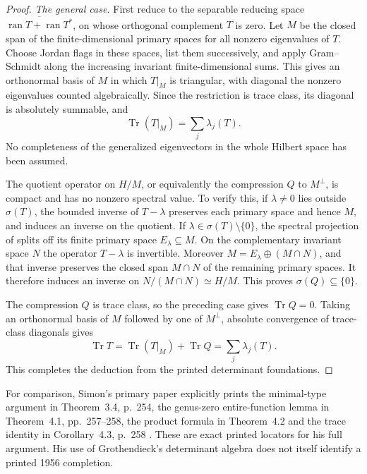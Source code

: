\begin{proof}
\emph{The general case.}
First reduce to the separable reducing space
$\overline{\operatorname{ran}T+\operatorname{ran}T^*}$, on whose
orthogonal complement $T$ is zero. Let $M$ be the closed span of the
finite-dimensional primary spaces for all nonzero eigenvalues of $T$.
Choose Jordan flags in these spaces, list them successively, and apply
Gram--Schmidt along the increasing invariant finite-dimensional sums.
This gives an orthonormal basis of $M$ in which $T|_M$ is triangular,
with diagonal the nonzero eigenvalues counted algebraically. Since the
restriction is trace class, its diagonal is absolutely summable, and
\[
 \operatorname{Tr}(T|_M)=\sum_j\lambda_j(T).
\]
No completeness of the generalized eigenvectors in the whole Hilbert
space has been assumed.

The quotient operator on $H/M$, or equivalently the compression $Q$ to
$M^\perp$, is compact and has no nonzero spectral value. To verify this,
if $\lambda\ne0$ lies outside $\sigma(T)$, the bounded inverse of
$T-\lambda$ preserves each primary space and hence $M$, and induces
an inverse on the quotient. If $\lambda\in\sigma(T)\setminus\{0\}$,
the spectral projection of
\cite[Chapter II, \S4, Theorem 4, pp.~359--361]{Grothendieck1956Fredholm}
splits off its finite primary space $E_\lambda\subseteq M$. On the
complementary invariant space $N$ the operator $T-\lambda$ is invertible.
Moreover $M=E_\lambda\oplus(M\cap N)$, and that inverse preserves the
closed span $M\cap N$ of the remaining primary spaces. It therefore
induces an inverse on $N/(M\cap N)\simeq H/M$. This proves
$\sigma(Q)\subseteq\{0\}$.

The compression $Q$ is trace class, so the preceding case gives
$\operatorname{Tr}Q=0$. Taking an orthonormal basis of $M$ followed by
one of $M^\perp$, absolute convergence of trace-class diagonals gives
\[
 \operatorname{Tr}T=\operatorname{Tr}(T|_M)+\operatorname{Tr}Q
                  =\sum_j\lambda_j(T).
\]
This completes the deduction from the printed determinant foundations.
\end{proof}

For comparison, Simon's primary paper explicitly prints the minimal-type
argument in Theorem~3.4, p.~254, the genus-zero entire-function lemma in
Theorem~4.1, pp.~257--258, the product formula in Theorem~4.2 and the trace
identity in Corollary~4.3, p.~258 \cite{catSimon1977}. These are exact
printed locators for his full argument. His use of Grothendieck's
determinant algebra does not itself identify a printed 1956 completion.

